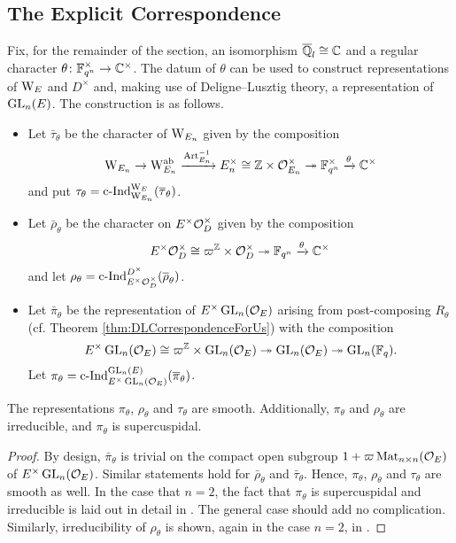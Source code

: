 \documentclass[../main.tex]{subfiles}
\begin{document}
\subsection{The Explicit Correspondence} %
\label{sub:The Explicit Correspondence}
Fix, for the remainder of the section, an isomorphism $\overline {\mathbb{Q}}_l \cong \mathbb{C}$ and
a regular character $\theta\colon  \mathbb{F}_{q^n}^\times \to \mathbb{C}^\times$. 
The datum of $\theta$ can be used to construct representations 
of $\mathrm W_E$ and $D^\times$ and, making use of Deligne--Lusztig
theory, a representation of $\operatorname{GL}_n(E)$. The construction is as follows.
\begin{itemize}
  \item Let $\bar \tau_\theta$ be the character of $\mathrm W_{E_n}$ given by 
    the composition
    \begin{equation*}
      \mathrm W_{E_n} \to \mathrm W_{E_n}^{\mathrm{ab}} \xrightarrow{\mathrm{Art}_{E_n}^{-1}} E_n^\times \cong
      \mathbb{Z} \times \mathcal{O}_{E_n}^\times \twoheadrightarrow \mathbb{F}_{q^n}^\times \xrightarrow{\theta} \mathbb{C}^\times
    \end{equation*}
  and put $\tau_\theta = \mathrm{c\text{-}Ind}_{\mathrm W_{E_n}}^{\mathrm W_E}(\overline \tau_\theta)$.
  \item Let $\bar \rho_\theta$ be the character on 
    $E^\times \mathcal{O}_D^\times$ given by the composition
    \begin{equation*}
      E^\times\mathcal{O}_D^\times \cong \varpi^{\mathbb{Z}} \times \mathcal{O}_D^\times \twoheadrightarrow 
      \mathbb{F}_{q^n} \xrightarrow{\theta} \mathbb{C}^\times
    \end{equation*}
    and let $\rho_\theta = \mathrm{c\text{-}Ind}_{E^\times \mathcal{O}_D^\times}^{D^\times}(\overline \rho_\theta)$.
  \item Let $\bar \pi_\theta$ be the representation of $E^\times \operatorname{GL}_n(\mathcal{O}_E)$
    arising from post-composing $R_\theta$ (cf. Theorem
    \ref{thm:DLCorrespondenceForUs}) with the composition
    \begin{equation*}
      E^\times \operatorname{GL}_n(\mathcal{O}_E) \cong \varpi^{\mathbb{Z}} \times \operatorname{GL}_n(\mathcal{O}_E)
      \twoheadrightarrow \operatorname{GL}_n(\mathcal{O}_E) \twoheadrightarrow \operatorname{GL}_n(\mathbb{F}_q).
    \end{equation*}
    Let $\pi_\theta = \mathrm{c\text{-}Ind}_{E^\times \operatorname{GL}_n(\mathcal{O}_E)}^{\operatorname{GL}_n(E)}(\overline \pi_\theta)$. 
\end{itemize}

\begin{lem}\label{lem:BarRepsAreSmooth}
  The representations   $\pi_\theta$, $\rho_\theta$ and $\tau_\theta$ are smooth. 
  Additionally, $\pi_\theta$ and $\rho_\theta$ are irreducible, and
  $\pi_\theta$ is supercuspidal.
  \begin{proof}
    By design, $\bar \pi_\theta$ is trivial on the compact open subgroup $1 +
    \varpi \operatorname{Mat}_{n \times n}(\mathcal{O}_E)$ of $E^\times \operatorname{GL}_n(\mathcal{O}_E)$. Similar
    statements hold for $\bar \rho_\theta$ and $\bar \tau_\theta$. Hence,
    $\pi_\theta$, $\rho_\theta$ and $\tau_\theta$ are smooth as well. 
    In the case that $n=2$, the fact that $\pi_\theta$ is supercuspidal and
    irreducible is laid out in detail in \cite[Section 11]{bushnell2006local}.
    The general case should add no complication. 
    Similarly, irreducibility of $\rho_\theta$ is shown, again in the case 
    $n=2$, in \cite[Section 54]{bushnell2006local}. 
  \end{proof}
\end{lem}
\end{document}
